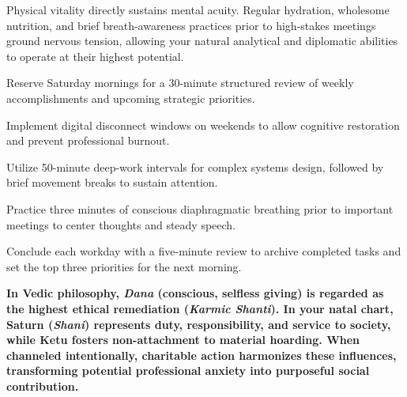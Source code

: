 {\fontsize{9}{13}\selectfont Physical vitality directly sustains mental acuity. Regular hydration, wholesome nutrition, and brief breath-awareness practices prior to high-stakes meetings ground nervous tension, allowing your natural analytical and diplomatic abilities to operate at their highest potential.}\par\vspace{1.8mm}

\begin{diamondlist}
  \item {\fontsize{8.5}{12}\selectfont Reserve Saturday mornings for a 30-minute structured review of weekly accomplishments and upcoming strategic priorities.}
  \item {\fontsize{8.5}{12}\selectfont Implement digital disconnect windows on weekends to allow cognitive restoration and prevent professional burnout.}
  \item {\fontsize{8.5}{12}\selectfont Utilize 50-minute deep-work intervals for complex systems design, followed by brief movement breaks to sustain attention.}
  \item {\fontsize{8.5}{12}\selectfont Practice three minutes of conscious diaphragmatic breathing prior to important meetings to center thoughts and steady speech.}
  \item {\fontsize{8.5}{12}\selectfont Conclude each workday with a five-minute review to archive completed tasks and set the top three priorities for the next morning.}
\end{diamondlist}


\label{topic64}

{\fontsize{9.5}{13.8}\selectfont\bfseries\color{DeepSlate} In Vedic philosophy, \textit{Dana} (conscious, selfless giving) is regarded as the highest ethical remediation (\textit{Karmic Shanti}). In your natal chart, Saturn (\textit{Shani}) represents duty, responsibility, and service to society, while Ketu fosters non-attachment to material hoarding. When channeled intentionally, charitable action harmonizes these influences, transforming potential professional anxiety into purposeful social contribution.}\par\vspace{2mm}

